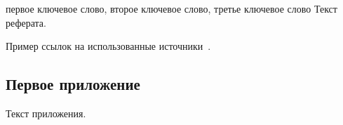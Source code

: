 \documentclass{bmstu}
\begin{document}
\begin{essay}{первое ключевое слово, второе ключевое слово, третье ключевое слово}
	Текст реферата.
	
	Пример ссылок на использованные источники~\cite{CitekeyArticle, CitekeyBook, CitekeyMisc}.
\end{essay}

\maketableofcontents

\begin{definitions}
\end{definitions}

\begin{abbreviations}
\end{abbreviations}

\makebibliography

\begin{appendices}
	\chapter{Первое приложение}
	Текст приложения.
\end{appendices}
\end{document}
